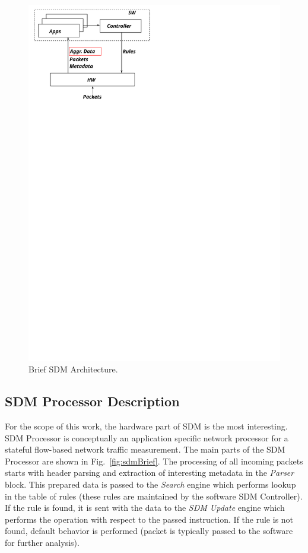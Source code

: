 \begin{figure}[t]
\centering
\includegraphics[scale=0.57]{chapters/pic/sdm_arch}
\caption{Brief SDM Architecture.}
\label{fig:sdmArchConcept}
\end{figure}

\subsection{SDM Processor Description}
For the scope of this work, the hardware part of SDM is the most interesting.
SDM Processor is conceptually an application specific network processor for a stateful flow-based network traffic measurement.
The main parts of the SDM Processor are  
shown in Fig.~\ref{fig:sdmBrief}. The processing of all incoming packets starts with header
parsing and extraction of interesting metadata in the \textit{Parser} block. 
This prepared data is passed to the \textit{Search} engine which performs lookup in the table of rules 
(these rules are maintained by the software SDM Controller).
If the rule is found, it is sent with the data to the \textit{SDM Update} engine which performs the operation with respect to the passed instruction.
If the rule is not found, default behavior is performed (packet is typically passed to the software for further analysis).

